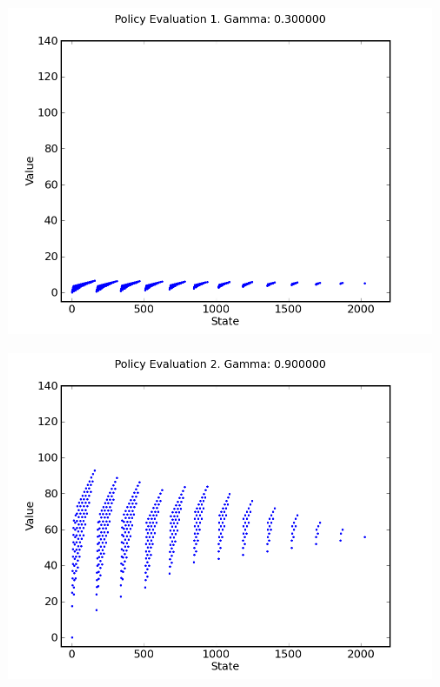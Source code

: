 \documentclass[a4paper]{article}
\begin{document}
\begin{figure}[h]
\center
\includegraphics[scale=0.8]{gamma_iteration/gamma_3_1.png}
\end{figure}

\begin{figure}[h]
\center
\includegraphics[scale=0.8]{gamma_iteration/gamma_9_2.png}
\end{figure}
\end{document}
